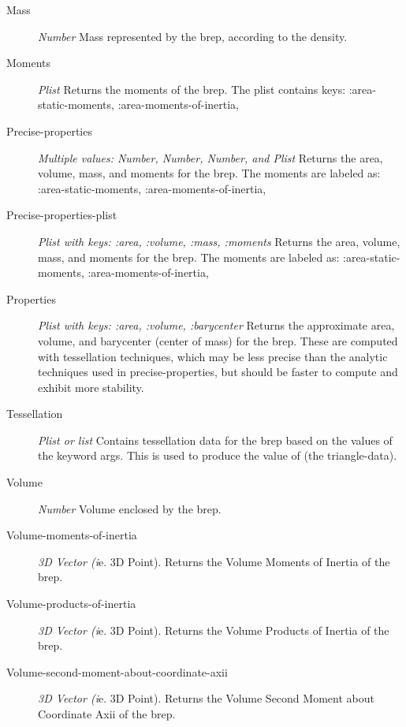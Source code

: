 \documentclass [11pt]{book}
\begin{document}
\begin{itemize}
\begin{description}
\item [Mass]
\emph{Number} Mass represented by the brep, according to the density.


\item [Moments]
\emph{Plist} Returns the moments of the brep. The plist contains keys: :area-static-moments, :area-moments-of-inertia,


\item [Precise-properties]
\emph{Multiple values: Number, Number, Number, and Plist} Returns the area, volume, mass,
and moments for the brep. The moments are labeled as: :area-static-moments, :area-moments-of-inertia,


\item [Precise-properties-plist]
\emph{Plist with keys: :area, :volume, :mass, :moments} Returns the area, volume, mass,
and moments for the brep. The moments are labeled as: :area-static-moments, :area-moments-of-inertia,


\item [Properties]
\emph{Plist with keys: :area, :volume, :barycenter} Returns the approximate area, volume,
and barycenter (center of mass) for the brep. These are computed with tessellation techniques,
which may be less precise than the analytic techniques used in precise-properties, but should
be faster to compute and exhibit more stability.



\item [Tessellation]
\emph{Plist or list} Contains tessellation data for the brep
based on the values of the keyword args. This is used to produce
the value of (the triangle-data).


\item [Volume]
\emph{Number} Volume enclosed by the brep.


\item [Volume-moments-of-inertia]
\emph{3D Vector (i}e. 3D Point). Returns the Volume Moments of Inertia of the brep.


\item [Volume-products-of-inertia]
\emph{3D Vector (i}e. 3D Point). Returns the Volume Products of Inertia of the brep.


\item [Volume-second-moment-about-coordinate-axii]
\emph{3D Vector (i}e. 3D Point). Returns the Volume Second Moment about Coordinate Axii of the brep.



\end{description}
\end{itemize}
\end{document}
